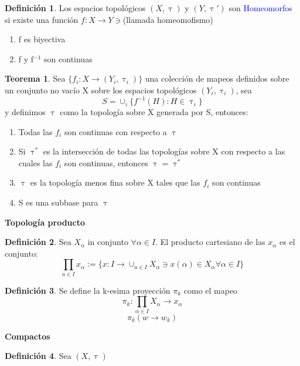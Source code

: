 \documentclass{article}
\theoremstyle{definition}
\newtheorem{definition}{Definición}[section]
\newtheorem{theorem}{Teorema}[section]
\begin{document}
\begin{definition}
	Los espacios topológicos $(X,\uptau)$ y $(Y,\uptau ')$ son \textcolor{blue}{Homeomorfos} si existe una función $f:X\to Y\ni$(llamada homeomofismo)
	\begin{enumerate}
		\item f es biyectiva
		\item f y f$^{-1}$ son continuas
	\end{enumerate}
\end{definition}
\begin{theorem}
	Sea $\{f_i:X\to(Y_i,\uptau_i)\}$ una colección de mapeos definidos sobre un conjunto no vacío X sobre los espacios topológicos $(Y_i,\uptau_i)$, sea 
	\[S=\cup_i \{f^{-1}(H):H\in\uptau_i\}\]
	y definimos $\uptau$ como la topología sobre X generada por S, entonces:
	\begin{enumerate}
	\item Todas las $f_i$ son continuas con respecto a $\uptau$
	\item Si $\uptau^*$ es la intersección de todas las topologías sobre X con respecto a las cuales las $f_i$ son continuas, entonces $\uptau=\uptau^*$
	\item $\uptau$ es la topología menos fina sobre X tales que las $f_i$ son continuas
	\item S es una subbase para $\uptau$
	\end{enumerate}
\end{theorem}

\begin{LARGE}
	\textbf{Topología producto}
\end{LARGE}
\begin{definition}
	Sea $X_{\alpha}$ in conjunto $\forall \alpha \in I$. El producto cartesiano de las $x_{\alpha}$ es el conjunto:
	\[\prod_{a\in I} x_{\alpha}:=\{x:I\to\cup_{a\in I}X_{\alpha}\ni x(\alpha) \in X_{\alpha}\forall \alpha \in I\}\]
\end{definition}
\begin{definition}
	Se define la k-esima proyección $\pi_k$ como el mapeo
	\[\pi_k: \prod_{\alpha \in I}X_{\alpha}\to x_{\alpha}\]
	\[\pi_k(w\to w_k)\]
\end{definition}
\begin{LARGE}
	\textbf{Compactos}
\end{LARGE}
\begin{definition}
	Sea $(X,\uptau)$
\end{definition}
\end{document}
